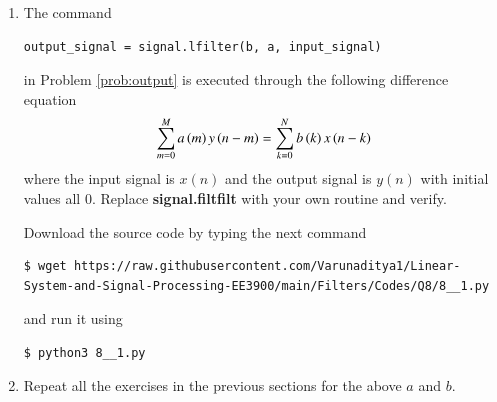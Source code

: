 \documentclass[journal,12pt,twocolumn]{IEEEtran}
\renewcommand\thesection{\arabic{section}}
\begin{document}
\begin{enumerate}[label=\thesection.\arabic*.,ref=\thesection.\theenumi]
\item
The command
\begin{lstlisting}
output_signal = signal.lfilter(b, a, input_signal)
\end{lstlisting}
in Problem \ref{prob:output} is executed through the following difference equation
\begin{equation}
\label{eq:iir_filter_gen}
 \sum _{m=0}^{M}a\left(m\right)y\left(n-m\right)=\sum _{k=0}^{N}b\left(k\right)x\left(n-k\right)
\end{equation}
where the input signal is $x(n)$ and the output signal is $y(n)$ with initial values all 0. Replace
\textbf{signal.filtfilt} with your own routine and verify.

\solution
Download the source code by typing the next command \\
\begin{lstlisting}
$ wget https://raw.githubusercontent.com/Varunaditya1/Linear-System-and-Signal-Processing-EE3900/main/Filters/Codes/Q8/8__1.py
\end{lstlisting}
and run it using
\begin{lstlisting}
$ python3 8__1.py
\end{lstlisting}
\item Repeat all the exercises in the previous sections for the above $a$ and $b$.


\end{enumerate}
\end{document}

